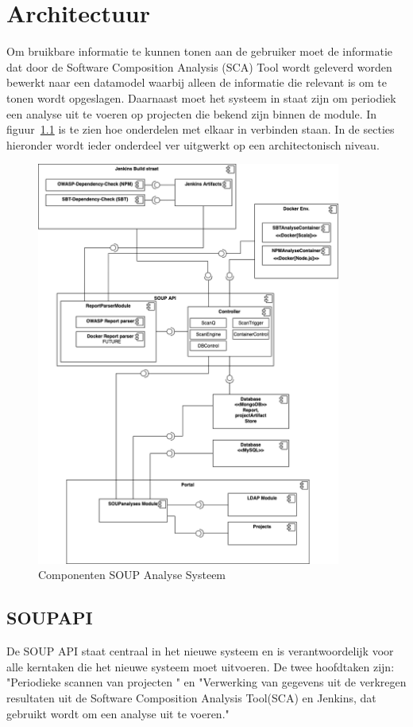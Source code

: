 \chapter{Architectuur}\label{ch:Architectuur}
Om bruikbare informatie te kunnen tonen aan de gebruiker moet de informatie dat door de Software Composition Analysis (SCA) Tool wordt geleverd worden bewerkt naar een datamodel waarbij alleen de informatie die relevant is om te tonen wordt opgeslagen. Daarnaast moet het systeem in staat zijn om periodiek een analyse uit te voeren op projecten die bekend zijn binnen de module. In figuur~\ref{fig:SOUP-Components} is te zien hoe onderdelen met elkaar in verbinden staan.
In de secties hieronder wordt ieder onderdeel ver uitgwerkt op een architectonisch niveau.

\begin{figure}[bth]
    \myfloatalign
    \includegraphics[width=10cm]{gfx/UMLcomponentDiagram}
    \caption{Componenten SOUP Analyse Systeem}
    \label{fig:SOUP-Components}
\end{figure}
\newpage %
\section{SOUPAPI}\label{sec:soupapi}
De SOUP API staat centraal in het nieuwe systeem en is verantwoordelijk voor alle kerntaken die het nieuwe systeem moet uitvoeren. De twee hoofdtaken zijn: "Periodieke scannen van projecten " en "Verwerking van gegevens uit de verkregen resultaten uit de Software Composition Analysis Tool(SCA) en Jenkins, dat gebruikt wordt om een analyse uit te voeren."

